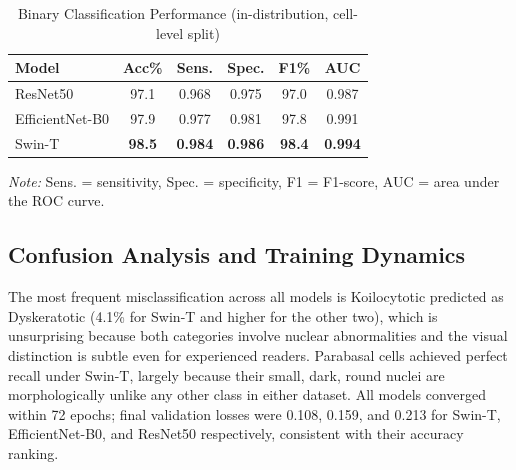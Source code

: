 \documentclass[runningheads]{llncs}
\begin{document}
\begin{table}[t]
\caption{Binary Classification Performance (in-distribution, cell-level split)}
\label{tab:binary}
\centering
\setlength{\tabcolsep}{3.5pt}
\begin{tabular}{lccccc}
\toprule
\textbf{Model} & \textbf{Acc\%} & \textbf{Sens.} & \textbf{Spec.} & \textbf{F1\%} & \textbf{AUC}\\
\midrule
ResNet50        & 97.1 & 0.968 & 0.975 & 97.0 & 0.987\\
EfficientNet-B0 & 97.9 & 0.977 & 0.981 & 97.8 & 0.991\\
Swin-T          & \textbf{98.5} & \textbf{0.984} & \textbf{0.986} & \textbf{98.4} & \textbf{0.994}\\
\bottomrule
\end{tabular}
\begin{flushleft}
\footnotesize \textit{Note:} Sens. = sensitivity, Spec. = specificity, F1 = F1-score, AUC = area under the ROC curve.
\end{flushleft}
\end{table}

\subsection{Confusion Analysis and Training Dynamics}

The most frequent misclassification across all models is Koilocytotic predicted as Dyskeratotic (4.1\% for Swin-T and higher for the other two), which is unsurprising because both categories involve nuclear abnormalities and the visual distinction is subtle even for experienced readers. Parabasal cells achieved perfect recall under Swin-T, largely because their small, dark, round nuclei are morphologically unlike any other class in either dataset. All models converged within 72 epochs; final validation losses were 0.108, 0.159, and 0.213 for Swin-T, EfficientNet-B0, and ResNet50 respectively, consistent with their accuracy ranking.
\end{document}
